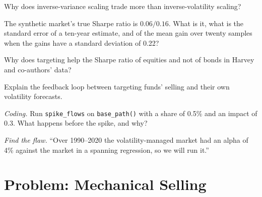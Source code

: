 \begin{exercise}[$\star$]\label{exo:s1:volatility-targeting-and-risk-managed-portfolios:3}
Why does inverse-variance scaling trade more than inverse-volatility scaling?
\end{exercise}

\begin{exercise}[$\star\star$]\label{exo:s1:volatility-targeting-and-risk-managed-portfolios:4}
The synthetic market's true Sharpe ratio is $0.06/0.16$. What is it, what is the standard error of a ten-year estimate, and of the mean gain over
twenty samples when the gains have a standard deviation of 0.22?
\end{exercise}

\begin{exercise}[$\star\star$]\label{exo:s1:volatility-targeting-and-risk-managed-portfolios:5}
Why does targeting help the Sharpe ratio of equities and not of bonds in Harvey and co-authors' data?
\end{exercise}

\begin{exercise}[$\star\star$]\label{exo:s1:volatility-targeting-and-risk-managed-portfolios:6}
Explain the feedback loop between targeting funds' selling and their own volatility forecasts.
\end{exercise}

\begin{exercise}[$\star\star\star$]\label{exo:s1:volatility-targeting-and-risk-managed-portfolios:7}
\emph{Coding.} Run \texttt{spike\_flows} on \texttt{base\_path()} with a share of 0.5\% and an impact of 0.3. What happens before the spike, and why?
\end{exercise}

\begin{exercise}[$\star\star\star$]\label{exo:s1:volatility-targeting-and-risk-managed-portfolios:8}
\emph{Find the flaw.} ``Over 1990--2020 the volatility-managed market had an alpha of 4\% against the market in a spanning regression, so we will run it.''
\end{exercise}

\section{Problem: Mechanical Selling}

